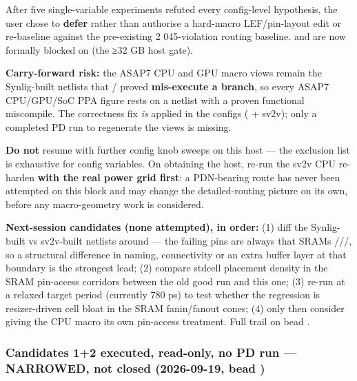 \begin{record}

After five single-variable experiments refuted every config-level
hypothesis, the user chose to \textbf{defer} rather than authorise a
hard-macro LEF/\allowbreak{}pin-layout edit or re-baseline against the
pre-existing 2 045-violation routing baseline.  and 
are now formally blocked on  (the ≥32 GB host gate).

\textbf{Carry-forward risk:} the ASAP7 CPU and GPU macro views remain
the Synlig-built netlists that / proved
\textbf{mis-execute a branch}, so every ASAP7
CPU/\allowbreak{}GPU/\allowbreak{}SoC PPA figure rests on a netlist with
a proven functional miscompile. The correctness fix \emph{is} applied in
the configs ( + sv2v); only a completed PD run to
regenerate the views is missing.

\textbf{Do not} resume with further config knob sweeps on this host ---
the exclusion list is exhaustive for config variables. On obtaining the
host, re-run the sv2v CPU re-harden \textbf{with the real power grid
first}: a PDN-bearing route has never been attempted on this block and
may change the detailed-routing picture on its own, before any
macro-geometry work is considered.

\textbf{Next-session candidates (none attempted), in order:} (1) diff
the Synlig-built vs sv2v-built netlists around
 --- the failing pins
are always that SRAM\textquotesingle s
///, so a structural
difference in naming, connectivity or an extra buffer layer at that
boundary is the strongest lead; (2) compare stdcell placement density in
the SRAM pin-access corridors between the old good run and this one; (3)
re-run at a relaxed target period (currently 780 ps) to test whether the
regression is resizer-driven cell bloat in the SRAM
fanin/\allowbreak{}fanout cones; (4) only then consider giving the CPU
macro its own pin-access treatment. Full trail on bead .

\end{record}

\subsubsection{\texorpdfstring{Candidates 1+2 executed, read-only, no PD
run --- NARROWED, not closed (2026-09-19, bead
)}{Candidates 1+2 executed, read-only, no PD run --- NARROWED, not closed (2026-09-19, bead )}}\label{cr:run:asap7:candidates-12-executed-read-only-no-pd-run-narrowed-not-closed-2026-09-19-bead-lxv}


